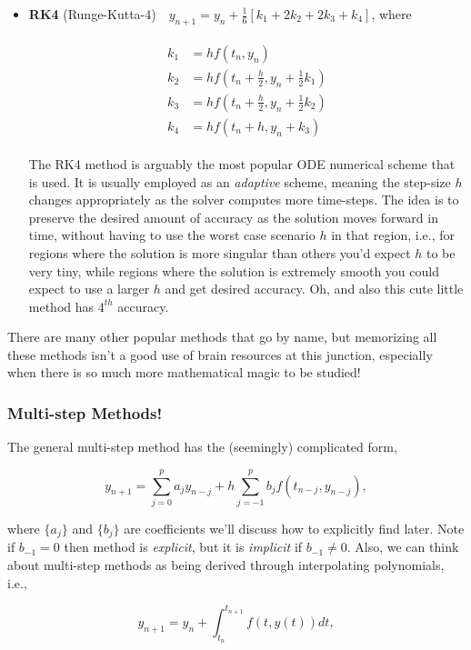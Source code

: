 \documentclass[paper=a4, fontsize=11pt]{scrartcl} %
\numberwithin{equation}{section} %
\numberwithin{figure}{section} %
\numberwithin{table}{section} %
\begin{document}
\begin{itemize}
\item {\bf{RK4}} (Runge-Kutta-4)\ \ $y_{n+1} = y_{n} + \frac{1}{6} \left[ k_1 + 2k_2 + 2k_3 + k_4  \right]$, where

\begin{align}
\nonumber
\begin{split}
k_1 &=  h f(t_n,y_n) \\
k_2 &= h f(t_n+\frac{h}{2}, y_n+ \frac{1}{2} k_1) \\
k_3 &= h f(t_n+\frac{h}{2}, y_n+ \frac{1}{2} k_2) \\
k_4 &= h f(t_n+h, y_n+k_3)
\end{split}	
\end{align}

	The RK4 method is arguably the most popular ODE numerical scheme that is used. It is usually employed as an \emph{adaptive} scheme, meaning the step-size $h$ changes appropriately as the solver computes more time-steps. The idea is to preserve the desired amount of accuracy as the solution moves forward in time, without having to use the worst case scenario $h$ in that region, i.e., for regions where the solution is more singular than others you'd expect $h$ to be very tiny, while regions where the solution is extremely smooth you could expect to use a larger $h$ and get desired accuracy. Oh, and also this cute little method has $4^{th}$ accuracy.

\end{itemize}

There are many other popular methods that go by name, but memorizing all these methods isn't a good use of brain resources at this junction, especially when there is so much more mathematical magic to be studied!

\subsubsection{Multi-step Methods!}

The general multi-step method has the (seemingly) complicated form,

$$y_{n+1} = \sum_{j=0}^{p} a_{j} y_{n-j} + h \sum_{j=-1}^{p} b_j f(t_{n-j},y_{n-j}),$$

where $\{a_{j}\}$ and $\{b_j\}$ are coefficients we'll discuss how to explicitly find later. Note if $b_{-1}=0$ then method is \emph{explicit}, but it is \emph{implicit} if $b_{-1}\neq 0$. Also, we can think about multi-step methods as being derived through interpolating polynomials, i.e.,

$$y_{n+1} = y_n + \int_{t_n}^{t_{n+1}} f(t,y(t)) dt,$$
\end{document}
